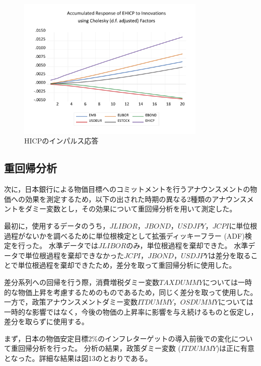 \documentclass[12pt]{jarticle}
\begin{document}
{\begin{figure}[!htbp]
\begin{minipage}{0.5\hsize}
\begin{center}
    \end{center}
  \end{minipage}
  \begin{minipage}{0.5\hsize}
    \caption{HICPのインパルス応答}
    \begin{center}
      \includegraphics[width=9cm]{iehicp.pdf}
    \end{center}
  \end{minipage}
\end{figure}

\newpage
\subsection{重回帰分析}

次に，日本銀行による物価目標へのコミットメントを行うアナウンスメントの物価への効果を測定するため，以下の出された時期の異なる2種類のアナウンスメントをダミー変数とし，その効果について重回帰分析を用いて測定した。

最初に，使用するデータのうち，$JLIBOR$，$JBOND$，$USDJPY$，$JCPI$に単位根過程がないかを調べるために単位根検定として拡張ディッキーフラー (ADF)検定を行った。
水準データでは$JLIBOR$のみ，単位根過程を棄却できた。
水準データで単位根過程を棄却できなかった$JCPI$，$JBOND$，$USDJPY$は差分を取ることで単位根過程を棄却できたため，差分を取って重回帰分析に使用した。

差分系列への回帰を行う際，消費増税ダミー変数$TAXDUMMY$については一時的な物価上昇を考慮するためのものであるため，同じく差分を取って使用した。一方で，政策アナウンスメントダミー変数$ITDUMMY$，$OSDUMMY$については一時的な影響ではなく，今後の物価の上昇率に影響を与え続けるものと仮定し，差分を取らずに使用する。

まず，日本の物価安定目標2\%のインフレターゲットの導入前後での変化について重回帰分析を行った。
分析の結果，政策ダミー変数 ($ITDUMMY$)は正に有意となった。詳細な結果は図13のとおりである。

}
\end{document}
